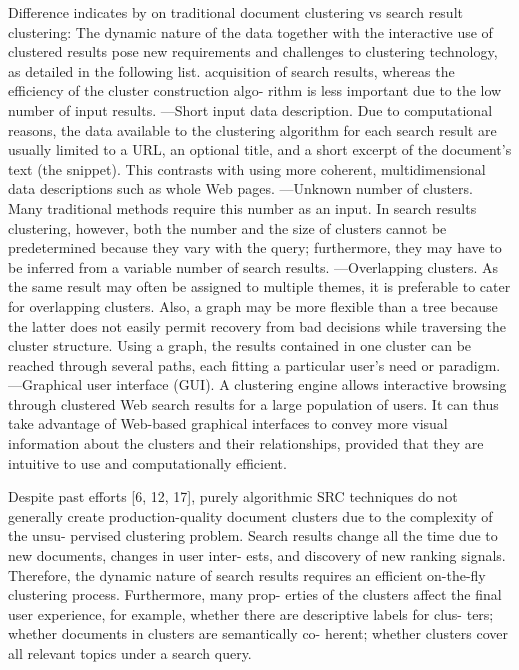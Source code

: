 \documentclass[runningheads]{llncs}
\begin{document}
Difference indicates by \cite{Carpineto} on traditional document clustering vs search result clustering:
The dynamic nature of the data together with the interactive use of clustered results pose new requirements and challenges to clustering technology, as detailed in the following list.
acquisition of search results, whereas the efficiency of the cluster construction algo- rithm is less important due to the low number of input results.
—Short input data description. Due to computational reasons, the data available to the clustering algorithm for each search result are usually limited to a URL, an optional title, and a short excerpt of the document’s text (the snippet). This contrasts with using more coherent, multidimensional data descriptions such as whole Web pages.
—Unknown number of clusters. Many traditional methods require this number as an input. In search results clustering, however, both the number and the size of clusters cannot be predetermined because they vary with the query; furthermore, they may have to be inferred from a variable number of search results.
—Overlapping clusters. As the same result may often be assigned to multiple themes, it is preferable to cater for overlapping clusters. Also, a graph may be more flexible than a tree because the latter does not easily permit recovery from bad decisions while traversing the cluster structure. Using a graph, the results contained in one cluster can be reached through several paths, each fitting a particular user’s need or paradigm.
—Graphical user interface (GUI). A clustering engine allows interactive browsing through clustered Web search results for a large population of users. It can thus take advantage of Web-based graphical interfaces to convey more visual information about the clusters and their relationships, provided that they are intuitive to use and computationally efficient.



Despite past efforts [6, 12, 17], purely algorithmic SRC techniques do not generally create production-quality document clusters due to the complexity of the unsu- pervised clustering problem. Search results change all the time due to new documents, changes in user inter- ests, and discovery of new ranking signals. Therefore, the dynamic nature of search results requires an efficient on-the-fly clustering process. Furthermore, many prop- erties of the clusters affect the final user experience, for example, whether there are descriptive labels for clus- ters; whether documents in clusters are semantically co- herent; whether clusters cover all relevant topics under a search query. \cite{Chang}
\end{document}
